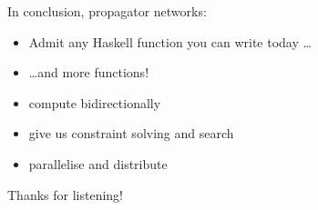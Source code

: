 \documentclass[usenames,dvipsnames,svgnames,table,aspectratio=1610,mathserif]{beamer}
\newcommand{\textslide}[1]{{
\begin{frame}
\begin{center}

#1

\end{center}
\end{frame}
}}
\newcommand{\textslideleft}[1]{{
\begin{frame}

#1

\end{frame}
}}
\begin{document}
\textslideleft{

In conclusion, propagator networks:

\begin{itemize}
\item Admit any Haskell function you can write today \ldots
\item \ldots and more functions!
\item compute bidirectionally
\item give us constraint solving and search
\item parallelise and distribute
\end{itemize}
}

%
%


\textslide{\Large{Thanks for listening!}}
\end{document}
